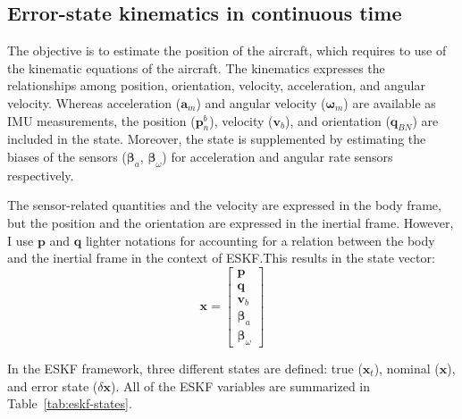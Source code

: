 \subsection{Error-state kinematics in continuous time}

The objective is to estimate the position of the aircraft, which requires to use of the kinematic equations of the aircraft. The kinematics expresses the relationships among position, orientation, velocity, acceleration, and angular velocity. Whereas acceleration ($\mathbf{a}_m$) and angular velocity ($\boldsymbol{\omega}_m$) are available as IMU measurements, the position ($\mathbf{p}_n^b$), velocity ($\mathbf{v}_b$), and orientation ($\mathbf{q}_{BN}$) are included in the state. Moreover, the state is supplemented by estimating the biases of the sensors ($\boldsymbol{\beta}_a$, $\boldsymbol{\beta}_\omega$) for acceleration and angular rate sensors respectively. 

The sensor-related quantities and the velocity are expressed in the body frame, but the position and the orientation are expressed in the inertial frame. However, I use $\mathbf{p}$ and $\mathbf{q}$ lighter notations for accounting for a relation between the body and the inertial frame in the context of ESKF.\@ This results in the state vector:
\begin{equation}
    \mathbf{x}=\begin{bmatrix}
    \mathbf{p} \\ \mathbf{q} \\ \mathbf{v}_b \\ \boldsymbol{\beta}_a \\ \boldsymbol{\beta}_\omega
    \end{bmatrix}
\end{equation}

In the ESKF framework, three different states are defined: true ($\mathbf{x}_t$), nominal ($\mathbf{x}$), and error state ($\delta\mathbf{x}$). All of the ESKF variables are summarized in Table~\ref{tab:eskf-states}.

